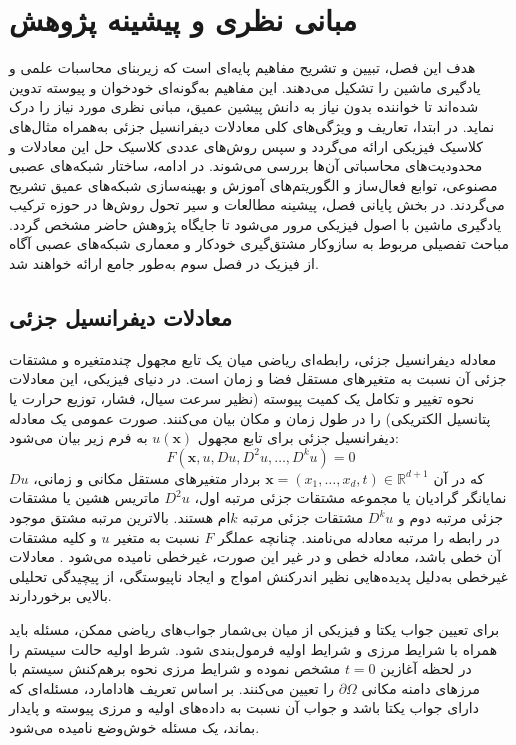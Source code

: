 \chapter{مبانی نظری و پیشینه پژوهش}
\label{ch:background}

هدف این فصل، تبیین و تشریح مفاهیم پایه‌ای است که زیربنای محاسبات علمی و یادگیری ماشین را تشکیل می‌دهند. این مفاهیم به‌گونه‌ای خودخوان و پیوسته تدوین شده‌اند تا خواننده بدون نیاز به دانش پیشین عمیق، مبانی نظری مورد نیاز را درک نماید. در ابتدا، تعاریف و ویژگی‌های کلی معادلات دیفرانسیل جزئی به‌همراه مثال‌های کلاسیک فیزیکی ارائه می‌گردد و سپس روش‌های عددی کلاسیک حل این معادلات و محدودیت‌های محاسباتی آن‌ها بررسی می‌شوند. در ادامه، ساختار شبکه‌های عصبی مصنوعی، توابع فعال‌ساز و الگوریتم‌های آموزش و بهینه‌سازی شبکه‌های عمیق تشریح می‌گردند. در بخش پایانی فصل، پیشینه مطالعات و سیر تحول روش‌ها در حوزه ترکیب یادگیری ماشین با اصول فیزیکی مرور می‌شود تا جایگاه پژوهش حاضر مشخص گردد. مباحث تفصیلی مربوط به سازوکار مشتق‌گیری خودکار و معماری شبکه‌های عصبی آگاه از فیزیک در فصل سوم به‌طور جامع ارائه خواهند شد.

\section{معادلات دیفرانسیل جزئی}
\label{sec:pde}

معادله دیفرانسیل جزئی، رابطه‌ای ریاضی میان یک تابع مجهول چندمتغیره و مشتقات جزئی آن نسبت به متغیرهای مستقل فضا و زمان است. در دنیای فیزیکی، این معادلات نحوه تغییر و تکامل یک کمیت پیوسته (نظیر سرعت سیال، فشار، توزیع حرارت یا پتانسیل الکتریکی) را در طول زمان و مکان بیان می‌کنند. صورت عمومی یک معادله دیفرانسیل جزئی برای تابع مجهول $u(\mathbf{x})$ به فرم زیر بیان می‌شود:
\begin{equation}
F\left(\mathbf{x}, u, Du, D^2u, \dots, D^ku\right) = 0
\label{eq:pde-general}
\end{equation}
که در آن $\mathbf{x} = (x_1, \dots, x_d, t) \in \mathbb{R}^{d+1}$ بردار متغیرهای مستقل مکانی و زمانی، $Du$ نمایانگر گرادیان یا مجموعه مشتقات جزئی مرتبه اول، $D^2u$ ماتریس هشین یا مشتقات جزئی مرتبه دوم و $D^ku$ مشتقات جزئی مرتبه $k$ام هستند. بالاترین مرتبه مشتق موجود در رابطه را مرتبه معادله می‌نامند. چنانچه عملگر $F$ نسبت به متغیر $u$ و کلیه مشتقات آن خطی باشد، معادله خطی و در غیر این صورت، غیرخطی نامیده می‌شود \cite{evans2010}. معادلات غیرخطی به‌دلیل پدیده‌هایی نظیر اندرکنش امواج و ایجاد ناپیوستگی، از پیچیدگی تحلیلی بالایی برخوردارند.

برای تعیین جواب یکتا و فیزیکی از میان بی‌شمار جواب‌های ریاضی ممکن، مسئله باید همراه با شرایط مرزی و شرایط اولیه فرمول‌بندی شود. شرط اولیه حالت سیستم را در لحظه آغازین $t=0$ مشخص نموده و شرایط مرزی نحوه برهم‌کنش سیستم با مرزهای دامنه مکانی $\partial\Omega$ را تعیین می‌کنند. بر اساس تعریف هادامارد، مسئله‌ای که دارای جواب یکتا باشد و جواب آن نسبت به داده‌های اولیه و مرزی پیوسته و پایدار بماند، یک مسئله خوش‌وضع نامیده می‌شود.

